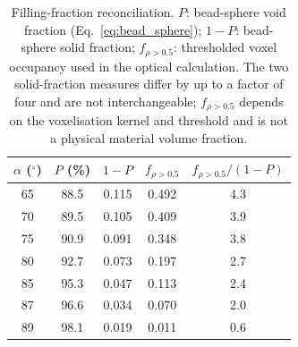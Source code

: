 \documentclass[aip,amsmath,amssymb,reprint]{revtex4-1}
\newcommand{\dang}{\ensuremath{\alpha}}
\newcommand{\bsP}{\ensuremath{P}}
\begin{document}
\begin{table}[htbp]
  \centering
  \caption{%
    Filling-fraction reconciliation.  $\bsP$: bead-sphere void fraction
    (Eq.~\ref{eq:bead_sphere}); $1-\bsP$: bead-sphere solid fraction;
    $f_{\rho>0.5}$: thresholded voxel occupancy used in the optical
    calculation.  The two solid-fraction measures differ by up to a factor
    of four and are not interchangeable; $f_{\rho>0.5}$ depends on the
    voxelisation kernel and threshold and is not a physical material volume
    fraction.
  }
  \label{tab:fcompare}
  \begin{tabular}{ccccc}
    \toprule
    $\dang$ ($^{\circ}$) & $\bsP$ (\%) & $1-\bsP$ & $f_{\rho>0.5}$ &
    $f_{\rho>0.5}/(1-\bsP)$ \\
    \midrule
    65 & 88.5 & 0.115 & 0.492 & 4.3 \\
    70 & 89.5 & 0.105 & 0.409 & 3.9 \\
    75 & 90.9 & 0.091 & 0.348 & 3.8 \\
    80 & 92.7 & 0.073 & 0.197 & 2.7 \\
    85 & 95.3 & 0.047 & 0.113 & 2.4 \\
    87 & 96.6 & 0.034 & 0.070 & 2.0 \\
    89 & 98.1 & 0.019 & 0.011 & 0.6 \\
    \bottomrule
  \end{tabular}
\end{table}
\end{document}
